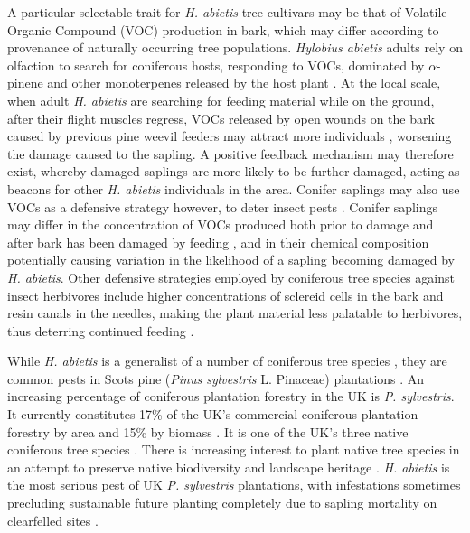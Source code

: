 \documentclass[a4paper, 11pt]{article}
\newcommand{\textapprox}{\raisebox{0.5ex}{\texttildelow}}
\begin{document}
A particular selectable trait for \textit{H. abietis} tree cultivars may be that of Volatile Organic Compound (VOC) production in bark, which may differ according to provenance of naturally occurring tree populations. \textit{Hylobius abietis} adults rely on olfaction to search for coniferous hosts, responding to VOCs, dominated by $\alpha$-pinene and other monoterpenes released by the host plant \citep{Nordlander1986, Nordlander1987}. At the local scale, when adult \textit{H. abietis} are searching for feeding material while on the ground, after their flight muscles regress, VOCs released by open wounds on the bark caused by previous pine weevil feeders may attract more individuals \citep{Nordlander1987, Tilles1986}, worsening the damage caused to the sapling. A positive feedback mechanism may therefore exist, whereby damaged saplings are more likely to be further damaged, acting as beacons for other \textit{H. abietis} individuals in the area. Conifer saplings may also use VOCs as a defensive strategy however, to deter insect pests \citep{Gershenzon1991, Trapp2001}. Conifer saplings may differ in the concentration of VOCs produced both prior to damage and after bark has been damaged by feeding \citep{Kivimaenpaa2012, Keeling2006}, and in their chemical composition \citep{Heijari2011} potentially causing variation in the likelihood of a sapling becoming damaged by \textit{H. abietis}. Other defensive strategies employed by coniferous tree species against insect herbivores include higher concentrations of sclereid cells in the bark and resin canals in the needles, making the plant material less palatable to herbivores, thus deterring continued feeding \citep{Donnelly2016, King2011}.

While \textit{H. abietis} is a generalist of a number of coniferous tree species \citep{Wallertz2014, Toivonen2006}, they are common pests in Scots pine (\textit{Pinus sylvestris} L. Pinaceae) plantations \citep{Manlove1997}. An increasing percentage of coniferous plantation forestry in the UK is \textit{P. sylvestris}. It currently constitutes \textapprox{}17\% of the UK's commercial coniferous plantation forestry by area and \textapprox{}15\% by biomass \citep{ForestryStatistics2018}. It is one of the UK's three native coniferous tree species \citep{Cheffings2005}. There is increasing interest to plant native tree species in an attempt to preserve native biodiversity and landscape heritage \citep{HoC2016}. \textit{H. abietis} is the most serious pest of UK \textit{P. sylvestris} plantations, with infestations sometimes precluding sustainable future planting completely due to sapling mortality on clearfelled sites \citep{Willoughby2017}.
\end{document}
